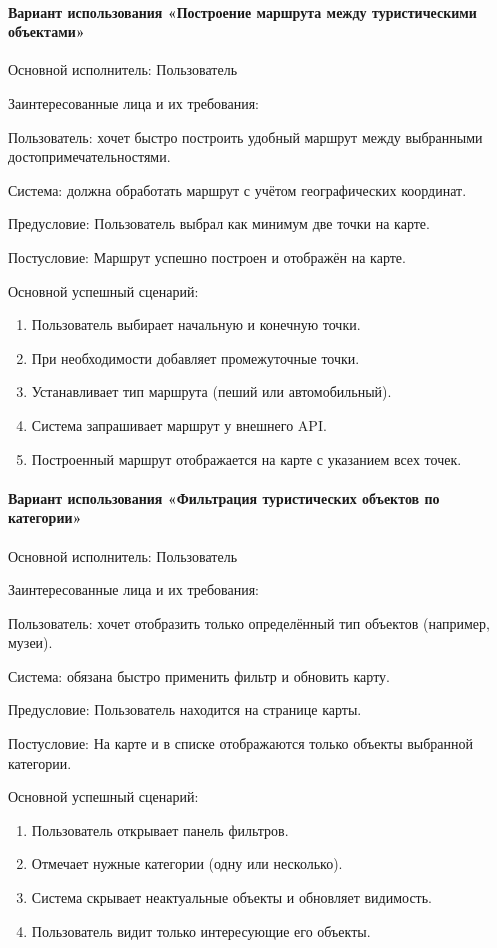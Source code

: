 \paragraph{Вариант использования «Построение маршрута между туристическими объектами»}

Основной исполнитель: Пользователь

Заинтересованные лица и их требования:

Пользователь: хочет быстро построить удобный маршрут между выбранными достопримечательностями.

Система: должна обработать маршрут с учётом географических координат.

Предусловие: Пользователь выбрал как минимум две точки на карте.

Постусловие: Маршрут успешно построен и отображён на карте.

Основной успешный сценарий:
\begin{enumerate}
	\item Пользователь выбирает начальную и конечную точки.
	\item При необходимости добавляет промежуточные точки.
	\item Устанавливает тип маршрута (пеший или автомобильный).
	\item Система запрашивает маршрут у внешнего API.
	\item Построенный маршрут отображается на карте с указанием всех точек.
\end{enumerate}

\paragraph{Вариант использования «Фильтрация туристических объектов по категории»}

Основной исполнитель: Пользователь

Заинтересованные лица и их требования:

Пользователь: хочет отобразить только определённый тип объектов (например, музеи).

Система: обязана быстро применить фильтр и обновить карту.

Предусловие: Пользователь находится на странице карты.

Постусловие: На карте и в списке отображаются только объекты выбранной категории.

Основной успешный сценарий:
\begin{enumerate}
	\item Пользователь открывает панель фильтров.
	\item Отмечает нужные категории (одну или несколько).
	\item Система скрывает неактуальные объекты и обновляет видимость.
	\item Пользователь видит только интересующие его объекты.
\end{enumerate}

